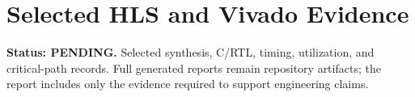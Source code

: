 \chapter{Selected HLS and Vivado Evidence}
\textbf{Status: PENDING.} Selected synthesis, C/RTL, timing, utilization, and critical-path
records. Full generated reports remain repository artifacts; the report includes only the
evidence required to support engineering claims.
